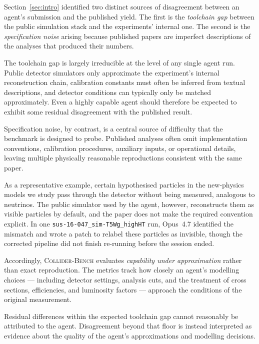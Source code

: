 \documentclass{article}
\newcommand{\ColliderBench}{\textsc{Collider-Bench}}
\begin{document}
Section~\ref{sec:intro} identified two distinct sources of disagreement
between an agent's submission and the published yield. The first is
the \emph{toolchain gap} between the public simulation stack and the
experiments' internal one. The second is the
\emph{specification noise} arising because published papers are
imperfect descriptions of the analyses that produced their numbers.

The toolchain gap is largely irreducible at the level of any single
agent run. Public detector simulators only approximate the
experiment's internal reconstruction chain, calibration constants must
often be inferred from textual descriptions, and detector conditions
can typically only be matched approximately. Even a highly capable
agent should therefore be expected to exhibit some residual
disagreement with the published result.

Specification noise, by contrast, is a central source of difficulty
that the benchmark is designed to probe. Published analyses often omit
implementation conventions, calibration procedures, auxiliary inputs,
or operational details, leaving multiple physically reasonable
reproductions consistent with the same paper.

As a representative example, certain hypothesised particles in the
new-physics models we study pass through the detector without being
measured, analogous to neutrinos. The public simulator used by the
agent, however, reconstructs them as visible particles by default,
and the paper does not make the required convention explicit. In one
\texttt{sus-16-047\_sim-T5Wg\_highHT} run, Opus~4.7 identified the
mismatch and wrote a patch to relabel these particles as invisible,
though the corrected pipeline did not finish re-running before the
session ended.

Accordingly, \ColliderBench{} evaluates \emph{capability under
approximation} rather than exact reproduction. The metrics track how
closely an agent's modelling choices --- including detector settings,
analysis cuts, and the treatment of cross sections, efficiencies, and
luminosity factors --- approach the conditions of the original
measurement.

Residual differences within the expected toolchain gap cannot
reasonably be attributed to the agent. Disagreement beyond that floor
is instead interpreted as evidence about the quality of the agent's
approximations and modelling decisions.
\fi


\end{document}
